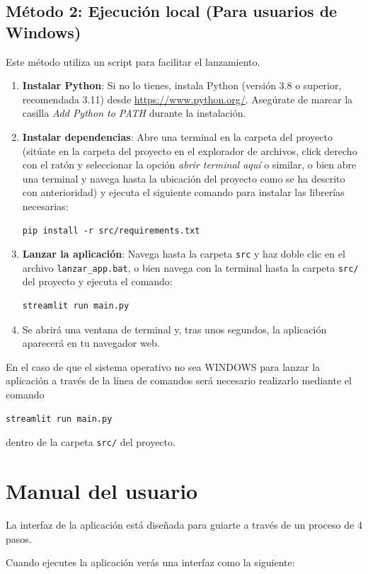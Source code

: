 \subsection{Método 2: Ejecución local (Para usuarios de Windows)}
Este método utiliza un script para facilitar el lanzamiento.
\begin{enumerate}
\item \textbf{Instalar Python}: Si no lo tienes, instala Python (versión 3.8 o superior, recomendada 3.11) desde \url{https://www.python.org/}. Asegúrate de marcar la casilla \textit{Add Python to PATH} durante la instalación.
\item \textbf{Instalar dependencias}: Abre una terminal en la carpeta del proyecto (sitúate en la carpeta del proyecto en el explorador de archivos, click derecho con el ratón y seleccionar la opción \textit{abrir terminal aquí} o similar, o bien abre una terminal y navega hasta la ubicación del proyecto como se ha descrito con anterioridad) y ejecuta el siguiente comando para instalar las librerías necesarias:
\begin{verbatim}
pip install -r src/requirements.txt
\end{verbatim}
\item \textbf{Lanzar la aplicación}: Navega hasta la carpeta \texttt{src} y haz doble clic en el archivo \texttt{lanzar\_app.bat}, o bien navega con la terminal hasta la carpeta \texttt{src/} del proyecto y ejecuta el comando:
\begin{verbatim}
streamlit run main.py
\end{verbatim}
\item Se abrirá una ventana de terminal y, tras unos segundos, la aplicación aparecerá en tu navegador web.
\end{enumerate}


En el caso de que el sistema operativo no sea WINDOWS para lanzar la aplicación a través de la línea de comandos será necesario realizarlo mediante el comando
\begin{verbatim}
streamlit run main.py
\end{verbatim}
dentro de la carpeta \texttt{src/} del proyecto.

\section{Manual del usuario}
La interfaz de la aplicación está diseñada para guiarte a través de un proceso de 4 pasos.

Cuando ejecutes la aplicación verás una interfaz como la siguiente:

